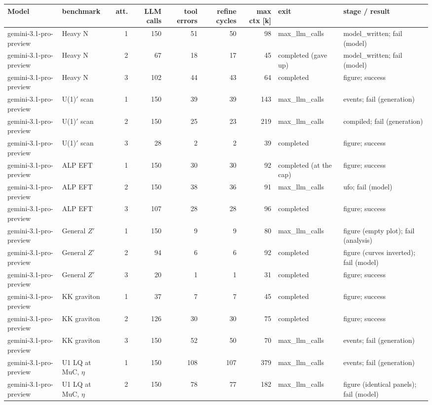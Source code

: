 \begin{tabular}{llrrrrrll}
\toprule
Model & benchmark & att. & LLM calls & tool errors & refine cycles & max ctx [k] & exit & stage / result \\
\midrule
gemini-3.1-pro-preview & Heavy N & 1 & 150 & 51 & 50 & 98 & max\_llm\_calls & model\_written; fail (model) \\
gemini-3.1-pro-preview & Heavy N & 2 & 67 & 18 & 17 & 45 & completed (gave up) & model\_written; fail (model) \\
gemini-3.1-pro-preview & Heavy N & 3 & 102 & 44 & 43 & 64 & completed & figure; success \\
gemini-3.1-pro-preview & U(1)$'$ scan & 1 & 150 & 39 & 39 & 143 & max\_llm\_calls & events; fail (generation) \\
gemini-3.1-pro-preview & U(1)$'$ scan & 2 & 150 & 25 & 23 & 219 & max\_llm\_calls & compiled; fail (generation) \\
gemini-3.1-pro-preview & U(1)$'$ scan & 3 & 28 & 2 & 2 & 39 & completed & figure; success \\
gemini-3.1-pro-preview & ALP EFT & 1 & 150 & 30 & 30 & 92 & completed (at the cap) & figure; success \\
gemini-3.1-pro-preview & ALP EFT & 2 & 150 & 38 & 36 & 91 & max\_llm\_calls & ufo; fail (model) \\
gemini-3.1-pro-preview & ALP EFT & 3 & 107 & 28 & 28 & 96 & completed & figure; success \\
gemini-3.1-pro-preview & General $Z'$ & 1 & 150 & 9 & 9 & 80 & max\_llm\_calls & figure (empty plot); fail (analysis) \\
gemini-3.1-pro-preview & General $Z'$ & 2 & 94 & 6 & 6 & 92 & completed & figure (curves inverted); fail (model) \\
gemini-3.1-pro-preview & General $Z'$ & 3 & 20 & 1 & 1 & 31 & completed & figure; success \\
gemini-3.1-pro-preview & KK graviton & 1 & 37 & 7 & 7 & 45 & completed & figure; success \\
gemini-3.1-pro-preview & KK graviton & 2 & 126 & 30 & 30 & 75 & completed & figure; success \\
gemini-3.1-pro-preview & KK graviton & 3 & 150 & 52 & 50 & 70 & max\_llm\_calls & events; fail (generation) \\
gemini-3.1-pro-preview & U1 LQ at MuC, $\eta$ & 1 & 150 & 108 & 107 & 379 & max\_llm\_calls & events; fail (generation) \\
gemini-3.1-pro-preview & U1 LQ at MuC, $\eta$ & 2 & 150 & 78 & 77 & 182 & max\_llm\_calls & figure (identical panels); fail (model) \\

\end{tabular}
